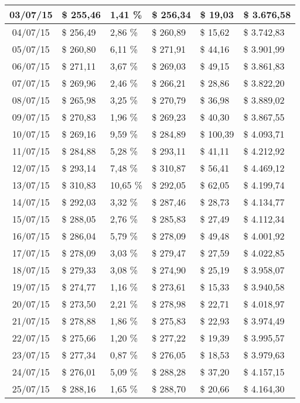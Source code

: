 \begin{small}
\begin{longtable}{|c|l|l|l|l|l|}
03/07/15 & \$ 255,46 & 1,41 \% & \$ 256,34 & \$ 19,03 & \$ 3.676,58 \\ \hline
04/07/15 & \$ 256,49 & 2,86 \% & \$ 260,89 & \$ 15,62 & \$ 3.742,83 \\ \hline
05/07/15 & \$ 260,80 & 6,11 \% & \$ 271,91 & \$ 44,16 & \$ 3.901,99 \\ \hline
06/07/15 & \$ 271,11 & 3,67 \% & \$ 269,03 & \$ 49,15 & \$ 3.861,83 \\ \hline
07/07/15 & \$ 269,96 & 2,46 \% & \$ 266,21 & \$ 28,86 & \$ 3.822,20 \\ \hline
08/07/15 & \$ 265,98 & 3,25 \% & \$ 270,79 & \$ 36,98 & \$ 3.889,02 \\ \hline
09/07/15 & \$ 270,83 & 1,96 \% & \$ 269,23 & \$ 40,30 & \$ 3.867,55 \\ \hline
10/07/15 & \$ 269,16 & 9,59 \% & \$ 284,89 & \$ 100,39 & \$ 4.093,71 \\ \hline
11/07/15 & \$ 284,88 & 5,28 \% & \$ 293,11 & \$ 41,11 & \$ 4.212,92 \\ \hline
12/07/15 & \$ 293,14 & 7,48 \% & \$ 310,87 & \$ 56,41 & \$ 4.469,12 \\ \hline
13/07/15 & \$ 310,83 & 10,65 \% & \$ 292,05 & \$ 62,05 & \$ 4.199,74 \\ \hline
14/07/15 & \$ 292,03 & 3,32 \% & \$ 287,46 & \$ 28,73 & \$ 4.134,77 \\ \hline
15/07/15 & \$ 288,05 & 2,76 \% & \$ 285,83 & \$ 27,49 & \$ 4.112,34 \\ \hline
16/07/15 & \$ 286,04 & 5,79 \% & \$ 278,09 & \$ 49,48 & \$ 4.001,92 \\ \hline
17/07/15 & \$ 278,09 & 3,03 \% & \$ 279,47 & \$ 27,59 & \$ 4.022,85 \\ \hline
18/07/15 & \$ 279,33 & 3,08 \% & \$ 274,90 & \$ 25,19 & \$ 3.958,07 \\ \hline
19/07/15 & \$ 274,77 & 1,16 \% & \$ 273,61 & \$ 15,33 & \$ 3.940,58 \\ \hline
20/07/15 & \$ 273,50 & 2,21 \% & \$ 278,98 & \$ 22,71 & \$ 4.018,97 \\ \hline
21/07/15 & \$ 278,88 & 1,86 \% & \$ 275,83 & \$ 22,93 & \$ 3.974,49 \\ \hline
22/07/15 & \$ 275,66 & 1,20 \% & \$ 277,22 & \$ 19,39 & \$ 3.995,57 \\ \hline
23/07/15 & \$ 277,34 & 0,87 \% & \$ 276,05 & \$ 18,53 & \$ 3.979,63 \\ \hline
24/07/15 & \$ 276,01 & 5,09 \% & \$ 288,28 & \$ 37,20 & \$ 4.157,15 \\ \hline
25/07/15 & \$ 288,16 & 1,65 \% & \$ 288,70 & \$ 20,66 & \$ 4.164,30 \\ \hline

\end{longtable}
\end{small}
